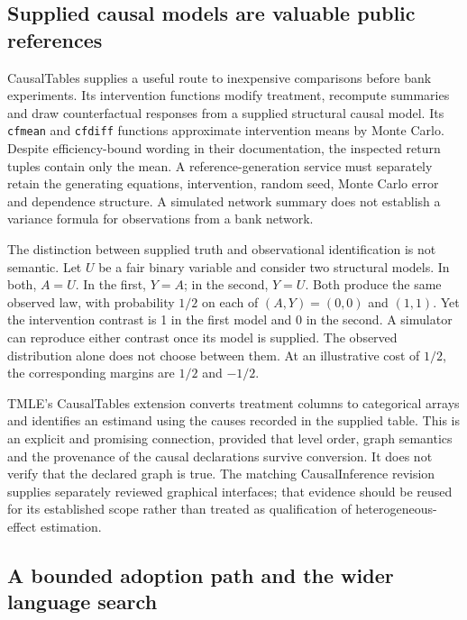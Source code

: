 \subsection{Supplied causal models are valuable public references}
\label{exec21:effects-scm}

CausalTables supplies a useful route to inexpensive comparisons before bank
experiments. Its intervention functions modify treatment, recompute
summaries and draw counterfactual responses from a supplied structural
causal model. Its \texttt{cfmean} and \texttt{cfdiff} functions approximate
intervention means by Monte Carlo. Despite efficiency-bound wording in
their documentation, the inspected return tuples contain only the mean.
A reference-generation service must separately retain the generating
equations, intervention, random seed, Monte Carlo error and dependence
structure. A simulated network summary does not establish a variance formula
for observations from a bank network. \citep{exec21_effects_causaltables}

The distinction between supplied truth and observational identification is
not semantic. Let $U$ be a fair binary variable and consider two structural
models. In both, $A=U$. In the first, $Y=A$; in the second, $Y=U$. Both
produce the same observed law, with probability $1/2$ on each of
$(A,Y)=(0,0)$ and $(1,1)$. Yet the intervention contrast is 1 in the first
model and 0 in the second. A simulator can reproduce either contrast once
its model is supplied. The observed distribution alone does not choose
between them. At an illustrative cost of $1/2$, the corresponding margins
are $1/2$ and $-1/2$. \citep{exec21_effects_reference}

TMLE's CausalTables extension converts treatment columns to categorical
arrays and identifies an estimand using the causes recorded in the supplied
table. This is an explicit and promising connection, provided that level
order, graph semantics and the provenance of the causal declarations survive
conversion. It does not verify that the declared graph is true. The
matching CausalInference revision supplies separately reviewed graphical
interfaces; that evidence should be reused for its established scope rather
than treated as qualification of heterogeneous-effect estimation.
\citep{exec21_effects_tmle,exec19_otherid_julia}

\subsection{A bounded adoption path and the wider language search}
\label{exec21:effects-integration}

